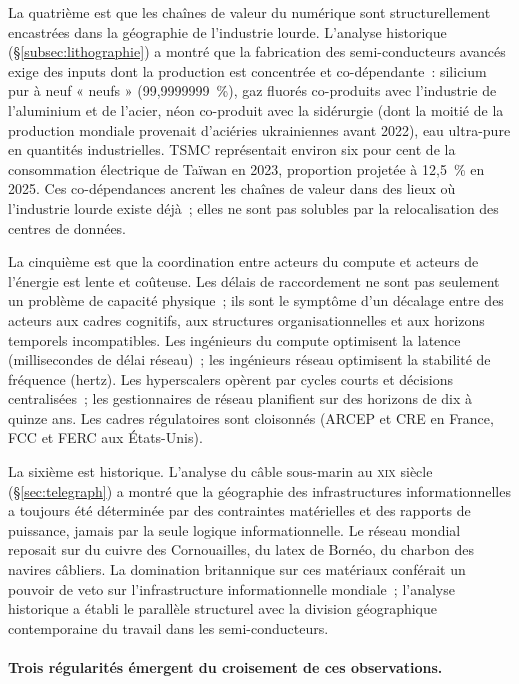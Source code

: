 La quatrième est que les chaînes de valeur du numérique sont structurellement encastrées dans la géographie de l'industrie lourde. L'analyse historique (§\ref{subsec:lithographie}) a montré que la fabrication des semi-conducteurs avancés exige des inputs dont la production est concentrée et co-dépendante~: silicium pur à neuf « neufs » (99,9999999~\%), gaz fluorés co-produits avec l'industrie de l'aluminium et de l'acier, néon co-produit avec la sidérurgie (dont la moitié de la production mondiale provenait d'aciéries ukrainiennes avant 2022), eau ultra-pure en quantités industrielles. TSMC représentait environ six pour cent de la consommation électrique de Taïwan en 2023, proportion projetée à 12,5~\% en 2025. Ces co-dépendances ancrent les chaînes de valeur dans des lieux où l'industrie lourde existe déjà~; elles ne sont pas solubles par la relocalisation des centres de données.

La cinquième est que la coordination entre acteurs du compute et acteurs de l'énergie est lente et coûteuse. Les délais de raccordement ne sont pas seulement un problème de capacité physique~; ils sont le symptôme d'un décalage entre des acteurs aux cadres cognitifs, aux structures organisationnelles et aux horizons temporels incompatibles. Les ingénieurs du compute optimisent la latence (millisecondes de délai réseau)~; les ingénieurs réseau optimisent la stabilité de fréquence (hertz). Les hyperscalers opèrent par cycles courts et décisions centralisées~; les gestionnaires de réseau planifient sur des horizons de dix à quinze ans. Les cadres régulatoires sont cloisonnés (ARCEP et CRE en France, FCC et FERC aux États-Unis).

La sixième est historique. L'analyse du câble sous-marin au \textsc{xix}\ieme{} siècle (§\ref{sec:telegraph}) a montré que la géographie des infrastructures informationnelles a toujours été déterminée par des contraintes matérielles et des rapports de puissance, jamais par la seule logique informationnelle. Le réseau mondial reposait sur du cuivre des Cornouailles, du latex de Bornéo, du charbon des navires câbliers. La domination britannique sur ces matériaux conférait un pouvoir de veto sur l'infrastructure informationnelle mondiale~; l'analyse historique a établi le parallèle structurel avec la division géographique contemporaine du travail dans les semi-conducteurs.

\paragraph{Trois régularités émergent du croisement de ces observations.}

